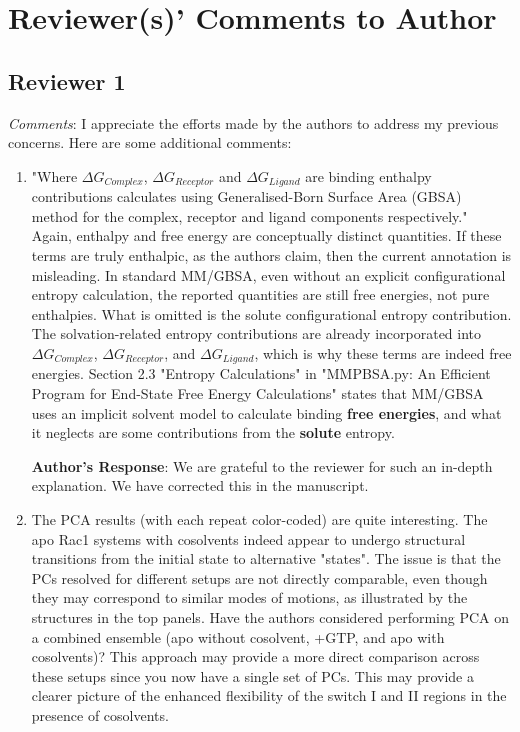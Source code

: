 \documentclass[11pt, a4paper]{article}
\begin{document}
\section{Reviewer(s)' Comments to Author}

\subsection{Reviewer 1}
\emph{Comments}:
I appreciate the efforts made by the authors to address my previous concerns. Here are some additional comments:

\begin{enumerate}
 
    \item "Where $\Delta G_{Complex}$, $\Delta G_{Receptor}$ and $\Delta G_{Ligand}$ are binding enthalpy contributions calculates using Generalised-Born Surface Area (GBSA) method for the complex, receptor and ligand components respectively."
    Again, enthalpy and free energy are conceptually distinct quantities. If these terms are truly enthalpic, as the authors claim, then the current annotation is misleading. In standard MM/GBSA, even without an explicit configurational entropy calculation, the reported quantities are still free energies, not pure enthalpies. What is omitted is the solute configurational entropy contribution. The solvation-related entropy contributions are already incorporated into $\Delta G_{Complex}$, $\Delta G_{Receptor}$, and $\Delta G_{Ligand}$, which is why these terms are indeed free energies. Section 2.3 "Entropy Calculations" in "{MMPBSA.py}: An Efficient Program for End-State Free Energy Calculations" states that MM/GBSA uses an implicit solvent model to calculate binding \textbf{free energies}, and what it neglects are some contributions from the \textbf{solute} entropy.

    \textbf{Author's Response}: We are grateful to the reviewer for such an in-depth explanation. We have corrected this in the manuscript.

    \item The PCA results (with each repeat color-coded) are quite interesting. The apo Rac1 systems with cosolvents indeed appear to undergo structural transitions from the initial state to alternative "states". The issue is that the PCs resolved for different setups are not directly comparable, even though they may correspond to similar modes of motions, as illustrated by the structures in the top panels. Have the authors considered performing PCA on a combined ensemble (apo without cosolvent, +GTP, and apo with cosolvents)? This approach may provide a more direct comparison across these setups since you now have a single set of PCs. This may provide a clearer picture of the enhanced flexibility of the switch I and II regions in the presence of cosolvents.


\end{enumerate}
\end{document}
